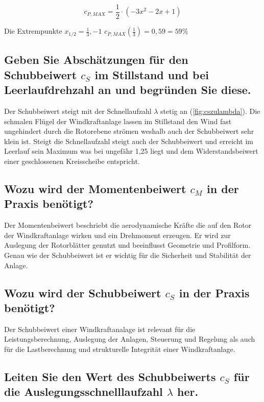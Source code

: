 \begin{equation}
c_{P,MAX}=\frac{1}{2} \cdot (-3x^2-2x+1)
\label{eq:CPMAX2}
\end{equation}
 
Die Extrempunkte  $x_{1/2}= \frac{1}{3}, -1$
$c_{P,MAX}(\frac{1}{3})=0,59 = 59\%$

\subsection{Geben Sie Abschätzungen für den Schubbeiwert $c_S$ im Stillstand und bei
Leerlaufdrehzahl an und begründen Sie diese.}

Der Schubbeiwert steigt mit der Schnellaufzahl $\lambda$ stetig an (\ref{fig:cszulambda}). Die schmalen Flügel der Windkraftanlage lassen im Stillstand den Wind fast ungehindert durch die Rotorebene strömen weshalb auch der Schubbeiwert sehr klein ist. Steigt die Schnellaufzahl steigt auch der Schubbeiwert und erreicht im Leerlauf sein Maximum was bei ungefähr 1,25 liegt und dem Widerstandsbeiwert einer geschlossenen Kreisscheibe entspricht. 


\subsection{Wozu wird der Momentenbeiwert $c_M$ in der Praxis benötigt?}

Der Momentenbeiwert beschriebt die aerodynamische Kräfte die auf den Rotor der Windkraftanlage wirken und ein Drehmoment erzeugen. Er wird zur Auslegung der Rotorblätter genutzt und beeinflusst Geometrie und Profilform. Genau wie der Schubbeiwert ist er wichtig für die Sicherheit und Stabilität der Anlage. 


\subsection{Wozu wird der Schubbeiwert $c_S$ in der Praxis benötigt?}

Der Schubbeiwert einer Windkraftanalage ist relevant für die Leistungsberechnung, Auslegung der Anlagen, Steuerung und Regelung als auch für die Lastberechnung und strukturelle Integrität einer Windkraftanlage. 

\subsection{Leiten Sie den Wert des Schubbeiwerts $c_S$ für die Auslegungsschnelllaufzahl $\lambda$
her.}






\label{sec:Vorbereitungsfragen}
